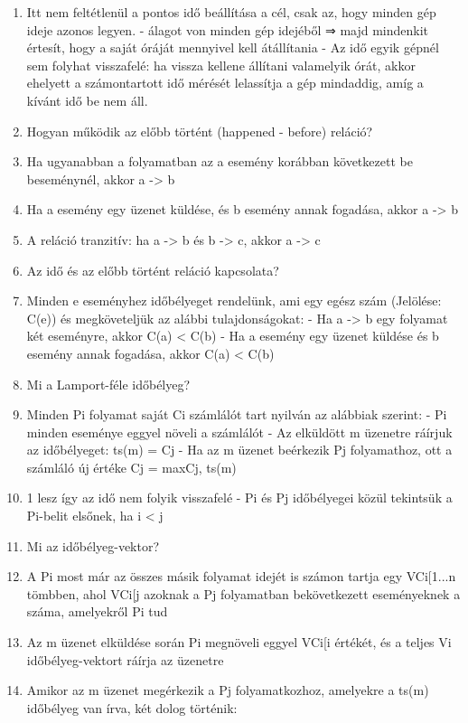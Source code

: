 \documentclass[twoside, a4paper, 12pt]{article}
\begin{document}
\begin{enumerate}
            \item Itt nem feltétlenül a pontos idő beállítása a cél, csak az, hogy minden gép ideje azonos legyen.
                - álagot von minden gép idejéből
                ⇒ majd mindenkit értesít, hogy a saját óráját mennyivel kell átállítania
                - Az idő egyik gépnél sem folyhat visszafelé: ha vissza kellene állítani valamelyik órát,
                akkor ehelyett a számontartott idő mérését lelassítja a gép mindaddig, amíg a kívánt idő be nem áll.
            \item  Hogyan működik az előbb történt (happened - before) reláció?
            \item Ha ugyanabban a folyamatban az a esemény korábban következett be beseménynél, akkor a -> b
            \item Ha a esemény egy üzenet küldése, és b esemény annak fogadása, akkor a -> b
            \item A reláció tranzitív:  ha a -> b és b -> c, akkor a -> c
            \item  Az idő és az előbb történt reláció kapcsolata?
            \item Minden e eseményhez időbélyeget rendelünk, ami egy egész szám (Jelölése:  C(e)) és megköveteljük az alábbi tulajdonságokat:
                - Ha a -> b egy folyamat két eseményre, akkor C(a) < C(b)
                - Ha a esemény egy üzenet küldése és b esemény annak fogadása, akkor C(a) < C(b)
            \item  Mi a Lamport-féle időbélyeg?
            \item Minden Pi folyamat saját Ci számlálót tart nyilván az alábbiak szerint: 
                - Pi minden eseménye eggyel növeli a számlálót
                - Az elküldött m üzenetre ráírjuk az időbélyeget: ts(m) = Cj
                - Ha az m üzenet beérkezik Pj folyamathoz, ott a számláló új értéke Cj = max{Cj, ts(m)}\item1 lesz így az idő nem folyik visszafelé
                - Pi és Pj időbélyegei közül tekintsük a Pi-belit elsőnek, ha i < j
            \item  Mi az időbélyeg-vektor?
            \item A Pi most már az összes másik folyamat idejét is számon tartja egy VCi[1...n tömbben,
                ahol VCi[j azoknak a Pj folyamatban bekövetkezett eseményeknek a száma, amelyekről Pi tud
            \item Az m üzenet elküldése során Pi megnöveli eggyel  VCi[i értékét, és a teljes Vi időbélyeg-vektort ráírja az üzenetre
            \item Amikor az m üzenet megérkezik a Pj folyamatkozhoz, amelyekre a ts(m) időbélyeg van írva, két dolog történik:

\end{enumerate}
\end{document}
